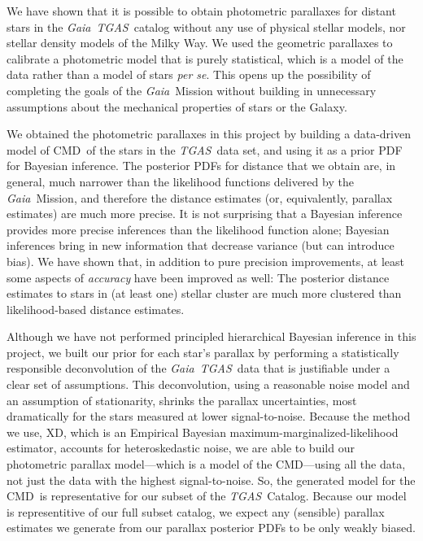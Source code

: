 \documentclass[modern]{aastex61}
\newcommand{\foreign}[1]{\textsl{#1}}
\newcommand{\acronym}[1]{{\small{#1}}}
\newcommand{\project}[1]{\textsl{#1}}
\newcommand{\tgas}{\project{\acronym{TGAS}}}
\newcommand{\gaia}{\project{Gaia}}
\newcommand{\xd}{\acronym{XD}}
\newcommand{\cmd}{\acronym{CMD}}
\begin{document}
We have shown that it is possible to obtain photometric parallaxes for
distant stars in the \gaia\ \tgas\ catalog without any use of physical stellar
models, nor stellar density models of the Milky Way.
We used the geometric parallaxes to calibrate a photometric
model that is purely statistical, which is a model of the data rather than
a model of stars \foreign{per se}.
This opens up the possibility of completing the goals of the \gaia\ Mission
without building in unnecessary assumptions about the mechanical properties
of stars or the Galaxy.

We obtained the photometric parallaxes in this project
by building a data-driven model of \cmd\ of the stars in the \tgas\ data set,
and using it as a prior PDF for Bayesian inference.
The posterior PDFs for distance that we obtain are, in general, much
narrower than the likelihood functions delivered by the
\gaia\ Mission, and therefore the distance estimates (or,
equivalently, parallax estimates) are much more precise.
It is not surprising that a Bayesian inference provides more
precise inferences than the likelihood function alone; Bayesian
inferences bring in new information that decrease variance (but
can introduce bias).
We have shown that, in addition to pure precision improvements, at
least some aspects of \emph{accuracy} have been improved as well:
The posterior distance estimates to stars in (at least one) stellar
cluster are much more clustered than likelihood-based distance
estimates.

Although we have not performed principled hierarchical Bayesian inference in this
project, we built our prior for each star's parallax by
performing a statistically responsible deconvolution
of the \gaia\ \tgas\ data that is justifiable under a clear set of
assumptions.
This deconvolution, using a reasonable noise model and an
assumption of stationarity, shrinks the parallax uncertainties, most dramatically for the stars measured at lower signal-to-noise.
Because the method we use, \xd, which is
an Empirical Bayesian maximum-marginalized-likelihood estimator, accounts for
heteroskedastic noise, we are able to build our photometric parallax
model---which is a model of the \cmd---using
all the data, not just the data with the highest signal-to-noise.
So, the generated model for the \cmd\ is representative for
our subset of the \tgas\ Catalog.
Because our model is representitive of our full subset catalog, we expect any (sensible) parallax estimates
we generate from our parallax posterior PDFs to be only weakly biased.
\end{document}
